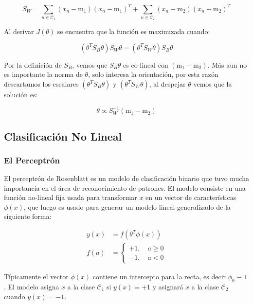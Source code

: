 \begin{equation}
	S_W = \sum_{n\in \mathcal{C}_1}(x_n-\text{m}_1)(x_n-\text{m}_1)^T+
	\sum_{n\in \mathcal{C}_2}(x_n-\text{m}_2)(x_n-\text{m}_2)^T
\end{equation}

Al derivar $J(\theta)$ se encuentra que la función es maximizada cuando:

\begin{equation}
	(\theta^TS_B\theta)S_W\theta = (\theta^TS_W\theta)S_B\theta
\end{equation}

Por la definición de $S_B$, vemos que $S_B\theta$ es co-lineal con $(\text{m}_1-\text{m}_2)$. Más aun no es importante la norma de $\theta$, solo interesa la orientación, por esta razón descartamos los escalares $(\theta^TS_B\theta)$ y $(\theta^TS_W\theta)$, al despejar $\theta$ vemos que la solución es:

\begin{equation}
	\theta \propto S_W^{-1}(\text{m}_1-\text{m}_2)
\end{equation}
\newpage
\subsection{Clasificación No Lineal}

\subsubsection{El Perceptrón}

El perceptrón de Rosenblatt es un modelo de clasificación binario que tuvo mucha importancia en el área de reconocimiento de patrones. El modelo consiste en una función no-lineal fija usada para transformar $x$ en un vector de características $\phi(x)$, que luego es usado para generar un modelo lineal generalizado de la siguiente forma:

\begin{align}
	y(x) &= f(\theta^T\phi(x))\\
	f(a) &= \left\{\begin{matrix}
	+1,\quad a\geq 0\\
	-1,\quad a<0
	\end{matrix}\right.
\end{align}

Típicamente el vector $\phi(x)$ contiene un intercepto para la recta, es decir $\phi_0\equiv1$. El modelo asigna $x$ a la clase $\mathcal{C}_1$ si $y(x)=+1$ y asignará $x$ a la clase $\mathcal{C}_2$ cuando $y(x)=-1$.

